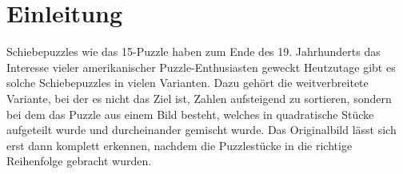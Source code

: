 \documentclass{whswinvcbook}
\begin{document}
\chapter{Einleitung}
Schiebepuzzles wie das 15-Puzzle haben zum Ende des 19. Jahrhunderts das Interesse vieler amerikanischer Puzzle-Enthusiasten geweckt\cite{perelman,sloson} Heutzutage gibt es solche Schiebepuzzles in vielen Varianten. Dazu gehört die weitverbreitete Variante, bei der es nicht das Ziel ist, Zahlen aufsteigend zu sortieren, sondern bei dem das Puzzle aus einem Bild besteht, welches in quadratische Stücke aufgeteilt wurde und durcheinander gemischt wurde. Das Originalbild lässt sich erst dann komplett erkennen, nachdem die Puzzlestücke in die richtige Reihenfolge gebracht wurden.
\begin{figure}[H]
    \centering
    \quad\quad\quad\quad
    \\
    \quad\quad\quad\quad
\end{figure}
\end{document}

